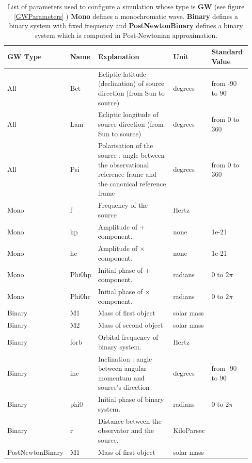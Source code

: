 \documentclass[a4paper,english,12pt]{article}
\begin{document}
\begin{table}[p]
\caption{List of parameters used to configure a simulation whose type is  \textbf{GW} (see figure \ref{GWParameters} ) \textbf{Mono} defines a monochromatic wave, \textbf{Binary} defines a binary system with fixed frequency and \textbf{PostNewtonBinary} defines a binary system which is computed in Post-Newtonian approximation. }
\begin{center} 
\begin{tabular}{|p{}|p{}|p{65mm}|p{}|p{}|} 
\hline 
\textbf{GW Type} & \textbf{Name} & \textbf{Explanation} & \textbf{Unit} & \textbf{Standard Value}  \\ 
\hline
All & Bet & Ecliptic latitude (declination) of source direction (from Sun to source) & degrees & from -90 to 90 \\
\hline
All & Lam & Ecliptic longitude of source direction (from Sun to source) & degrees & from 0 to 360 \\
\hline
All & Psi & Polarisation of the source : angle between the observational reference frame and the canonical reference frame & degrees & from 0 to 360  \\
\hline
\hline
Mono & f & Frequency of the source & Hertz &   \\
\hline
Mono & hp & Amplitude of $+$ component. & none &1e-21  \\
\hline
Mono & hc & Amplitude of $\times$ component. & none &1e-21  \\
\hline
Mono & Phi0hp & Initial phase of $+$ component. & radians & 0 to $2 \pi$  \\
\hline
Mono & Phi0hc & Initial phase of $\times$ component. & radians & 0 to $2 \pi$  \\
\hline
\hline
Binary & M1 & Mass of first object & solar mass&   \\
\hline
Binary & M2 &  Mass of second object & solar mass &  \\
\hline
Binary & forb & Orbital frequency of binary system. & Hertz &  \\
\hline
Binary & inc & Inclination : angle between angular momentum and source's direction & degrees & from -90 to 90 \\
\hline
Binary & phi0 & Initial phase of binary system. & radians & 0 to $2 \pi$  \\
\hline
Binary & r & Distance between the observator and the source. & KiloParsec &  \\
\hline
PostNewtonBinary & M1 & Mass of first object & solar mass&   \\

\end{tabular}
\end{center}
\end{table}
\end{document}
